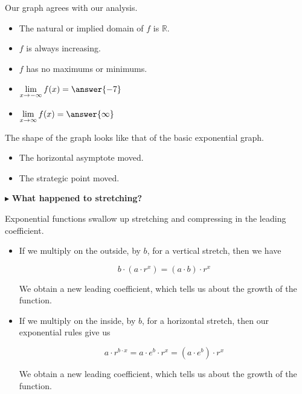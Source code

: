 \documentclass{ximera}
\begin{document}
\begin{example}
\begin{explanation}
Our graph agrees with our analysis.

\begin{itemize}
\item The natural or implied domain of $f$ is $\mathbb{R}$.
\item $f$ is always increasing.
\item $f$ has no maximums or minimums.
\item $\lim\limits_{x \to -\infty} f(x) = \answer{-7}$
\item $\lim\limits_{x \to \infty} f(x) = \answer{\infty}$
\end{itemize}




\end{explanation}

\end{example}


The shape of the graph looks like that of the basic exponential graph. \\


\begin{itemize}
\item The horizontal asymptote moved.
\item The strategic point moved.
\end{itemize}















$\blacktriangleright$ \textbf{What happened to stretching?}


Exponential functions swallow up stretching and compressing in the leading coefficient.


\begin{itemize}
\item If we multiply on the outside, by $b$, for a vertical stretch, then we have

\[
b \cdot (a \cdot r^x) = (a \cdot b) \cdot r^x
\]

We obtain a new leading coefficient, which tells us about the growth of the function. \\






\item If we multiply on the inside, by $b$, for a horizontal stretch, then our exponential rules give us

\[
a \cdot r^{b \cdot x} = a \cdot e^b \cdot r^x = (a \cdot e^b) \cdot r^x
\]

We obtain a new leading coefficient, which tells us about the growth of the function.


\end{itemize}
\end{document}
